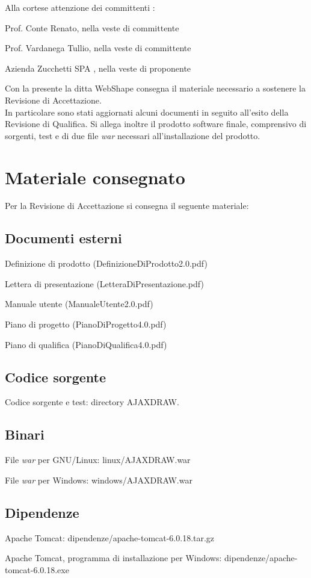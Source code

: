 Alla cortese attenzione dei committenti :
\begin{list}{-}{}
\item Prof. Conte Renato, nella veste di committente
\item Prof. Vardanega Tullio, nella veste di committente
\item Azienda Zucchetti SPA , nella veste di proponente
\end{list}

Con la presente la ditta WebShape consegna il materiale necessario a sostenere la Revisione di Accettazione. \\
In particolare sono stati aggiornati alcuni documenti in seguito all'esito della Revisione di Qualifica. Si allega inoltre il prodotto software finale, comprensivo di sorgenti, test e di due file \textit{war} necessari all'installazione del prodotto.


\section{Materiale consegnato}
Per la Revisione di Accettazione si consegna il seguente materiale: 
\subsection{Documenti esterni}
\begin{list}{-}{}
\item Definizione di prodotto (DefinizioneDiProdotto2.0.pdf)
\item Lettera di presentazione (LetteraDiPresentazione.pdf)
\item Manuale utente (ManualeUtente2.0.pdf)
\item Piano di progetto (PianoDiProgetto4.0.pdf)
\item Piano di qualifica (PianoDiQualifica4.0.pdf)
\end{list}
\subsection{Codice sorgente}
\begin{list}{-}{}
\item Codice sorgente e test: directory AJAXDRAW.
\end{list}
\subsection{Binari}
\begin{list}{-}{}
\item File \textit{war} per GNU/Linux: linux/AJAXDRAW.war
\item File \textit{war} per Windows: windows/AJAXDRAW.war
\end{list}
\subsection{Dipendenze}
\begin{list}{-}{}
\item Apache Tomcat: dipendenze/apache-tomcat-6.0.18.tar.gz
\item Apache Tomcat, programma di installazione per Windows: dipendenze/apache-tomcat-6.0.18.exe
\end{list}



